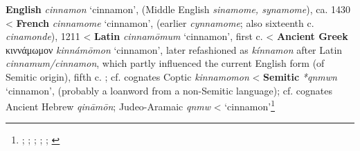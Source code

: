 \begin{etymology}\label{ety:cinnamon}
\textbf{English} \textit{cinnamon} `cinnamon', (Middle English \textit{sinamome, synamome}), ca. 1430
< \textbf{French} \textit{cinnamome} `cinnamon', (earlier \textit{cynnamome}; also sixteenth c. \textit{cinamonde}), 1211
< \textbf{Latin} \textit{cinnamōmum} `cinnamon', first c. \AD{}
< \textbf{Ancient Greek} {κιννάμωμον} \textit{kinnámōmon} `cinnamon', later refashioned as \textit{kínnamon} after Latin \textit{cinnamum/cinnamon}, which partly influenced the current English form (of Semitic origin), fifth c. \BC{}; cf. cognates Coptic  \textit{kinnamomon}
< \textbf{Semitic} \textit{*qnmwn} `cinnamon', (probably a loanword from a non-Semitic language); cf. cognates Ancient Hebrew  \textit{qināmōn}; Judeo-Aramaic  \textit{qnmw}
< `cinnamon'\footnote{\textcite[s.v. cinnamon]{oed}; \textcite{tlfi}; \textcite{lewis_latin_1879}; \textcite[701]{beekes_etymological_2010}; \textcite[585]{klein_comprehensive_1987}; \textcite{rosol_early_2018}}
\end{etymology}